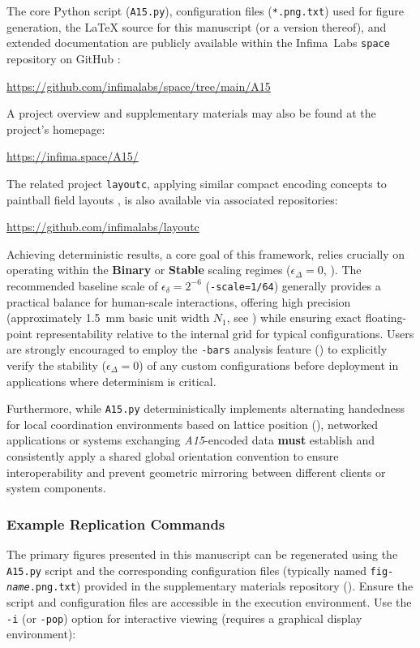 \documentclass[10pt]{article}
\def\AAAB{\textit{A15}}
\def\IL{Infima~Labs}
\begin{document}
The core Python script (\texttt{A15.py}), configuration files (\texttt{*.png.txt}) used for figure generation, the LaTeX source for this manuscript (or a version thereof), and extended documentation are publicly available within the \IL{} \texttt{space} repository on GitHub \cite{InfimaSpace}:
\begin{center}
    \url{https://github.com/infimalabs/space/tree/main/A15}
\end{center}
A project overview and supplementary materials may also be found at the project's homepage:
\begin{center}
    \url{https://infima.space/A15/}
\end{center}
The related project \texttt{layoutc}, applying similar compact encoding concepts to paintball field layouts \cite{Risinger2024Layoutc}, is also available via associated repositories:
\begin{center}
    \url{https://github.com/infimalabs/layoutc}
\end{center}

Achieving deterministic results, a core goal of this framework, relies crucially on operating within the \textbf{Binary} or \textbf{Stable} scaling regimes ($\epsilon_\Delta = 0$, ). The recommended baseline scale of $\epsilon_\delta = 2^{-6}$ (\texttt{-scale=1/64}) generally provides a practical balance for human-scale interactions, offering high precision (approximately \SI{1.5}{\milli\meter} basic unit width $N_1$, see ) while ensuring exact floating-point representability relative to the internal grid for typical configurations. Users are strongly encouraged to employ the \texttt{-bars} analysis feature () to explicitly verify the stability ($\epsilon_\Delta = 0$) of any custom configurations before deployment in applications where determinism is critical.

Furthermore, while \texttt{A15.py} deterministically implements alternating handedness for local coordination environments based on lattice position (), networked applications or systems exchanging \AAAB{}-encoded data \textbf{must} establish and consistently apply a shared global orientation convention to ensure interoperability and prevent geometric mirroring between different clients or system components.

\subsubsection{Example Replication Commands}\label{subsubsec-repl-commands}
The primary figures presented in this manuscript can be regenerated using the \texttt{A15.py} script and the corresponding configuration files (typically named \texttt{fig-\textit{name}.png.txt}) provided in the supplementary materials repository (). Ensure the script and configuration files are accessible in the execution environment. Use the \texttt{-i} (or \texttt{-pop}) option for interactive viewing (requires a graphical display environment):
\end{document}
